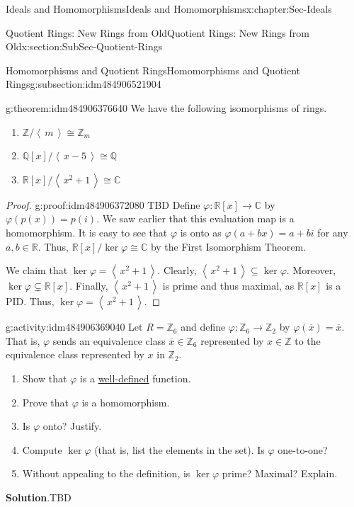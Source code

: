 \documentclass[oneside,10pt,]{book}
\newcommand{\blocktitlefont}{\relax}
\newcommand{\xreffont}{\relax}
\numberwithin{equation}{section}
\newcommand{\ideal}[1]{\left\langle\, #1 \,\right\rangle}
\def\p{\varphi}
\def\C{{\mathbb C}}
\def\Z{{\mathbb Z}}
\def\Q{{\mathbb Q}}
\def\R{{\mathbb R}}
\begin{document}
\begin{chapterptx}{Ideals and Homomorphisms}{}{Ideals and Homomorphisms}{}{}{x:chapter:Sec-Ideals}
\begin{sectionptx}{Quotient Rings: New Rings from Old}{}{Quotient Rings: New Rings from Old}{}{}{x:section:SubSec-Quotient-Rings}
\begin{subsectionptx}{Homomorphisms and Quotient Rings}{}{Homomorphisms and Quotient Rings}{}{}{g:subsection:idm484906521904}
\begin{theorem}{}{}{g:theorem:idm484906376640}%
We have the following isomorphisms of rings.%
\begin{enumerate}
\item{}\(\Z/\ideal{m} \cong \Z_m\)%
\item{}\(\Q[x]/\ideal{x-5} \cong \Q\)%
\item{}\(\R[x]/\ideal{x^2+1} \cong \C\)%
\end{enumerate}
%
\end{theorem}
\begin{proof}{}{g:proof:idm484906372080}
TBD Define \(\p: \R[x] \to \C\) by \(\p(p(x)) = p(i)\). We saw earlier that this evaluation map is a homomorphism. It is easy to see that \(\p\) is onto as \(\p(a+bx) = a+bi\) for any \(a,b\in \R\). Thus, \(\R[x]/\ker\p \cong \C\) by the First Isomorphism Theorem.%
\par
We claim that \(\ker\p = \ideal{x^2+1}\). Clearly, \(\ideal{x^2+1} \subseteq \ker\p\). Moreover, \(\ker\p \subsetneq \R[x]\). Finally, \(\ideal{x^2+1}\) is prime and thus maximal, as \(\R[x]\) is a PID. Thus, \(\ker\p = \ideal{x^2+1}\).%
\end{proof}
\begin{activity}{}{g:activity:idm484906369040}%
Let \(R = \Z_6\) and define \(\p : \Z_6 \to \Z_2\) by \(\p(\overline{x}) = \overline{x}\). That is, \(\p\) sends an equivalence class \(\overline{x}\in \Z_6\) represented by \(x\in \Z\) to the equivalence class represented by \(x\) in \(\Z_2\).%
%
\begin{enumerate}
\item{}Show that \(\p\) is a \hyperref[x:definition:def-well-defined]{well-defined} function.%
\item{}Prove that \(\p\) is a homomorphism.%
\item{}Is \(\p\) onto? Justify.%
\item{}Compute \(\ker\p\) (that is, list the elements in the set). Is \(\p\) one-to-one?%
\item{}Without appealing to the definition, is \(\ker\p\) prime? Maximal? Explain.%
\end{enumerate}
\par\smallskip%
\noindent\textbf{\blocktitlefont Solution}.\hypertarget{g:solution:idm484906356976}{}\quad{}TBD\end{activity}
\end{subsectionptx}
\end{sectionptx}
\end{chapterptx}
%
\backmatter
%
%
%
%
{\xreffont\printindex}
%
\end{document}
